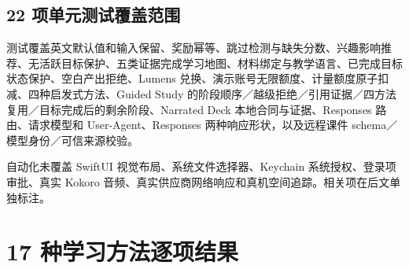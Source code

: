 \documentclass[10pt,a4paper,fontset=none]{ctexart}
\begin{document}
\subsection{22 项单元测试覆盖范围}
测试覆盖英文默认值和输入保留、奖励幂等、跳过检测与缺失分数、兴趣影响推荐、无活跃目标保护、五类证据完成学习地图、材料绑定与教学语言、已完成目标状态保护、空白产出拒绝、Lumens 兑换、演示账号无限额度、计量额度原子扣减、四种启发式方法、Guided Study 的阶段顺序／越级拒绝／引用证据／四方法复用／目标完成后的剩余阶段、Narrated Deck 本地合同与证据、Responses 路由、请求模型和 User-Agent、Responses 两种响应形状，以及远程课件 schema／模型身份／可信来源校验。

自动化未覆盖 SwiftUI 视觉布局、系统文件选择器、Keychain 系统授权、登录项审批、真实 Kokoro 音频、真实供应商网络响应和真机空间追踪。相关项在后文单独标注。

\clearpage
\section{17 种学习方法逐项结果}
\end{document}
